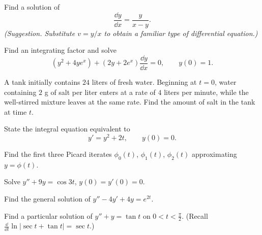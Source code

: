 \documentclass[11pt,oneside]{article}
\begin{document}
\begin{problem}
Find a solution of
\[
\frac{\dd y}{\dd x}=\frac{y}{x-y}.
\]
\textit{(Suggestion. Substitute $v=y/x$ to obtain a familiar type of differential equation.)}
\end{problem}

\begin{problem}
Find an integrating factor and solve
\[
(y^2+4ye^x)+(2y+2e^x)\frac{\dd y}{\dd x}=0,\qquad y(0)=1.
\]
\end{problem}

\begin{problem}
A tank initially contains $24$ liters of fresh water. Beginning at $t=0$, water containing $2$ g of salt per liter enters at a rate of $4$ liters per minute, while the well-stirred mixture leaves at the same rate. Find the amount of salt in the tank at time $t$.
\end{problem}

\begin{problem}
\begin{problemsubparts}
\item State the integral equation equivalent to
\[
y'=y^2+2t,\qquad y(0)=0.
\]
\item Find the first three Picard iterates $\phi_0(t)$, $\phi_1(t)$, $\phi_2(t)$ approximating $y=\phi(t)$.
\end{problemsubparts}
\end{problem}

\begin{problem}
Solve $y''+9y=\cos3t$, $y(0)=y'(0)=0$.
\end{problem}

\begin{problem}
Find the general solution of $y''-4y'+4y=e^{2t}$.
\end{problem}

\begin{problem}
Find a particular solution of $y''+y=\tan t$ on $0<t<\frac\pi2$. (Recall $\displaystyle\frac{\dd}{\dd t}\ln|\sec t+\tan t|=\sec t$.)
\end{problem}
\end{document}
